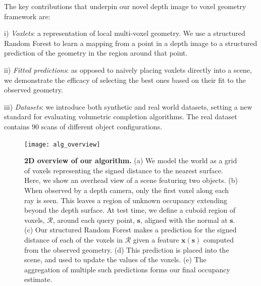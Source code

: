 \documentclass[10pt,twocolumn,letterpaper]{article}
\newcommand{\pixelidx}{\mathbf{s}}
\begin{document}
The key contributions that underpin our novel depth image to voxel geometry framework are:

\noindent i) \emph{Voxlets}: a representation of local multi-voxel geometry.
We use a structured Random Forest to learn a mapping from a point in a depth image to a structured prediction of the geometry in the region around that point.


\noindent ii) \emph{Fitted predictions}: as opposed to naively placing voxlets directly into a scene, we demonstrate the efficacy of selecting the best ones based on their fit to the observed geometry.

\noindent iii) \emph{Datasets}: we introduce both synthetic and real world datasets, setting a new standard for evaluating volumetric completion algorithms.
The real dataset contains $90$ scans of different object configurations.




\begin{figure}
     \texttt{[image: alg\_overview]}
         \caption{\textbf{2D overview of our algorithm.}
    (a) We model the world as a grid of voxels representing the signed distance to the nearest surface.
    Here, we show an overhead view of a scene featuring two objects.
    (b) When observed by a depth camera, only the first voxel along each ray is seen.
    This leaves a region of unknown occupancy extending beyond the depth surface.
    At test time, we define a cuboid region of voxels, $\mathcal{R}$, around each query point, $\pixelidx$, aligned with the normal at $\pixelidx$.
    (c) Our structured Random Forest makes a prediction for the signed distance of each of the voxels in $\mathcal{R}$ given a feature $\mathbf{x}(\mathbf{s})$ computed from the observed geometry.
    (d) This prediction is placed into the scene, and used to update the values of the voxels.
    (e) The aggregation of multiple such predictions forms our final occupancy estimate.}%
    \label{fig:overview}
    \vspace{-6pt}
\end{figure}



\end{document}
